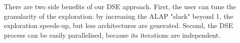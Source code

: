 There are two side benefits of our DSE approach. First, the user can tune the granularity of the exploration: by increasing the ALAP "slack" beyond 1, the exploration speeds-up, but less architectures are generated. Second, the DSE process can be easily parallelised, because its iterations are independent.



\vspace{-1mm}
